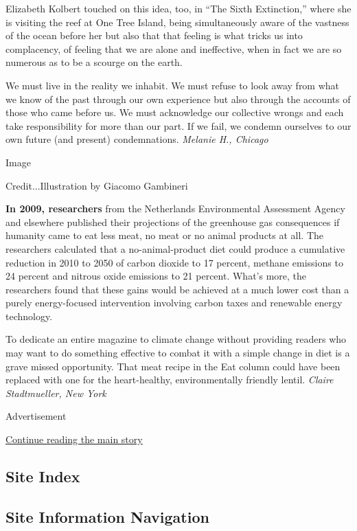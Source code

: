 Elizabeth Kolbert touched on this idea, too, in ``The Sixth
Extinction,'' where she is visiting the reef at One Tree Island, being
simultaneously aware of the vastness of the ocean before her but also
that that feeling is what tricks us into complacency, of feeling that we
are alone and ineffective, when in fact we are so numerous as to be a
scourge on the earth.

We must live in the reality we inhabit. We must refuse to look away from
what we know of the past through our own experience but also through the
accounts of those who came before us. We must acknowledge our collective
wrongs and each take responsibility for more than our part. If we fail,
we condemn ourselves to our own future (and present) condemnations.
\emph{Melanie H., Chicago}

Image

Credit...Illustration by Giacomo Gambineri

\textbf{In 2009, researchers} from the Netherlands Environmental
Assessment Agency and elsewhere published their projections of the
greenhouse gas consequences if humanity came to eat less meat, no meat
or no animal products at all. The researchers calculated that a
no-animal-product diet could produce a cumulative reduction in 2010 to
2050 of carbon dioxide to 17 percent, methane emissions to 24 percent
and nitrous oxide emissions to 21 percent. What's more, the researchers
found that these gains would be achieved at a much lower cost than a
purely energy-focused intervention involving carbon taxes and renewable
energy technology.

To dedicate an entire magazine to climate change without providing
readers who may want to do something effective to combat it with a
simple change in diet is a grave missed opportunity. That meat recipe in
the Eat column could have been replaced with one for the heart-healthy,
environmentally friendly lentil. \emph{Claire Stadtmueller, New York}

Advertisement

\protect\hyperlink{after-bottom}{Continue reading the main story}

\hypertarget{site-index}{%
\subsection{Site Index}\label{site-index}}

\hypertarget{site-information-navigation}{%
\subsection{Site Information
Navigation}\label{site-information-navigation}}

